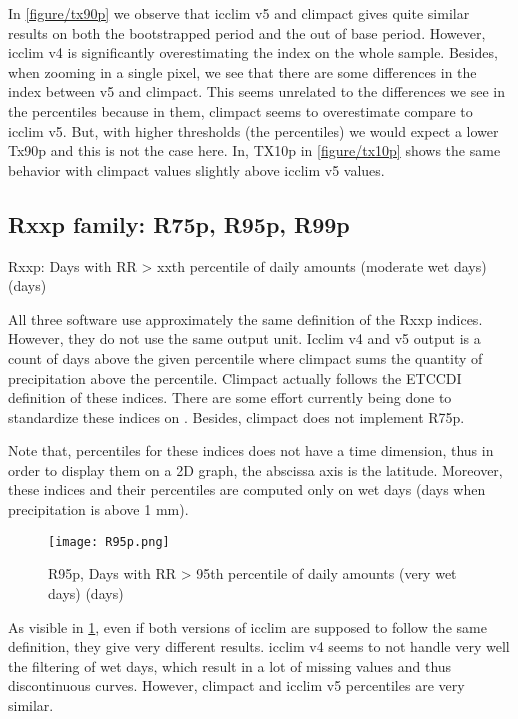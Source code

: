 \documentclass[a4paper,11pt]{article}
\begin{document}
    In \ref{figure/tx90p} we observe that icclim v5 and climpact gives quite similar results on both the bootstrapped period and the out of base period.
    However, icclim v4 is significantly overestimating the index on the whole sample.
    Besides, when zooming in a single pixel, we see that there are some differences in the index between v5 and climpact. This seems unrelated to the differences we see in the percentiles because in them, climpact seems to overestimate compare to icclim v5. But, with higher thresholds (the percentiles) we would expect a lower Tx90p and this is not the case here.
    In, TX10p in \ref{figure/tx10p} shows the same behavior with climpact values slightly above icclim v5 values.

\subsection{Rxxp family: R75p, R95p, R99p}
    Rxxp: Days with RR > xxth percentile of daily amounts (moderate wet days)(days)

    All three software use approximately the same definition of the Rxxp indices. However, they do not use the same output unit. Icclim v4 and v5 output is a count of days above the given percentile where climpact sums the quantity of precipitation above the percentile. Climpact actually follows the ETCCDI\cite{doc/etccdi} definition of these indices.
    There are some effort currently being done to standardize these indices on \cite{gh/clixmeta}.
    Besides, climpact does not implement R75p.

    Note that, percentiles for these indices does not have a time dimension, thus in order to display them on a 2D graph, the abscissa axis is the latitude.
    Moreover, these indices and their percentiles are computed only on wet days (days when precipitation is above 1 mm).

    \begin{figure}
        \centering
        \texttt{[image: R95p.png]}
        \caption{R95p, Days with RR > 95th percentile of daily amounts (very wet days) (days)}
        \label{figure/r95p}
    \end{figure}

    As visible in \ref{figure/r95p}, even if both versions of icclim are supposed to follow the same definition, they give very different results.
    icclim v4 seems to not handle very well the filtering of wet days, which result in a lot of missing values and thus discontinuous curves.
    However, climpact and icclim v5 percentiles are very similar.
\end{document}
